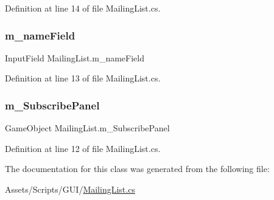 Definition at line 14 of file Mailing\+List.\+cs.

\mbox{\label{class_mailing_list_a50f154c98ab082a781ca81b873e26091}} 
\subsubsection{\texorpdfstring{m\+\_\+name\+Field}{m\_nameField}}
{\footnotesize\ttfamily Input\+Field Mailing\+List.\+m\+\_\+name\+Field}



Definition at line 13 of file Mailing\+List.\+cs.

\mbox{\label{class_mailing_list_aca8d46b50b49953f803c0c4f38328b59}} 
\subsubsection{\texorpdfstring{m\+\_\+\+Subscribe\+Panel}{m\_SubscribePanel}}
{\footnotesize\ttfamily Game\+Object Mailing\+List.\+m\+\_\+\+Subscribe\+Panel}



Definition at line 12 of file Mailing\+List.\+cs.



The documentation for this class was generated from the following file\+:\begin{DoxyCompactItemize}
\item 
Assets/\+Scripts/\+G\+U\+I/\mbox{\hyperlink{_mailing_list_8cs}{Mailing\+List.\+cs}}\end{DoxyCompactItemize}
